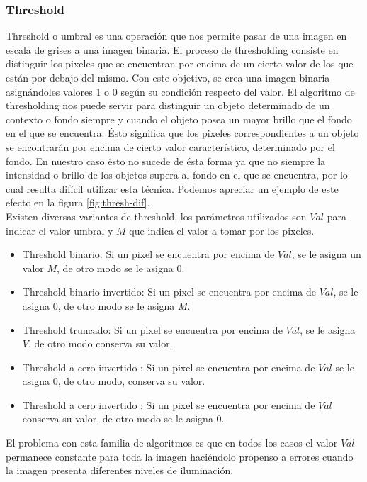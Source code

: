 	\subsubsection{\label{sec:thresh} Threshold}
Threshold o umbral es una operaci\'on que nos permite pasar de una 
imagen en escala de grises a una imagen binaria. El proceso de 
thresholding consiste en distinguir los pixeles que se encuentran por 
encima de un cierto valor de los que est\'an por debajo del mismo. Con 
este objetivo, se crea una imagen binaria asign\'andoles valores 1 o 0 
seg\'un su condici\'on respecto del valor. El algoritmo de thresholding 
nos puede servir para distinguir un objeto determinado de un contexto o 
fondo siempre y cuando el objeto posea un mayor brillo que el fondo en 
el que se encuentra. \'Esto significa que los pixeles correspondientes a 
un objeto se encontrar\'an por encima de cierto valor caracter\'istico, 
determinado por el fondo. En nuestro caso \'esto no sucede de \'esta forma ya que no siempre la intensidad o brillo de los objetos supera al fondo en el que se encuentra, por lo cual resulta dif\'icil utilizar esta t\'ecnica. Podemos apreciar un ejemplo de este efecto en la figura \ref{fig:thresh-dif}. \\
\indent Existen diversas variantes de threshold, los par\'ametros 
utilizados son $Val$ para indicar el valor umbral y $M$ que indica el 
valor a tomar por los pixeles.
\begin{itemize}
\item{ Threshold binario:  Si un pixel se encuentra por encima de $Val$, se le asigna un valor $M$, de otro modo se le asigna $0$.}
\item{ Threshold binario invertido:  Si un pixel se encuentra por encima de $Val$, se le asigna 0, de otro modo se le asigna $M$.}
\item{ Threshold truncado:  Si un pixel se encuentra por encima de $Val$, se le asigna $V$, de otro modo conserva su valor.}
\item{ Threshold a cero invertido : Si un pixel se encuentra por encima de $Val$ se le asigna $0$, de otro modo, conserva su valor.}
\item{ Threshold a cero invertido : Si un pixel se encuentra por encima de $Val$ conserva su valor, de otro modo se le asigna $0$.}
\end{itemize}
El problema con esta familia de algoritmos es que en todos los casos el 
valor $Val$ permanece constante para toda la imagen haci\'endolo propenso 
a errores cuando la imagen presenta diferentes niveles de iluminaci\'on. 

